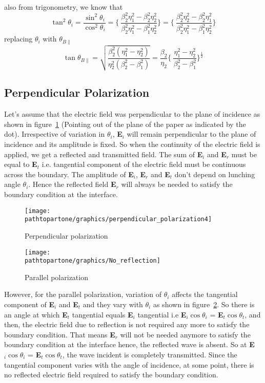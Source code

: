 also from trigonometry, we know that
\begin{equation*}
\tan^2\theta_i = \dfrac{\sin^2\theta_i}{\cos^2\theta_i} = \Bigg\{\ \dfrac{\beta^2_2\eta^2_1 - \beta^2_2\eta^2_2}{\beta^2_2\eta^2_1 - \beta^2_1\eta^2_2} \Bigg\} = \Bigg\{\ \dfrac{\beta^2_2\eta^2_2 - \beta^2_2\eta^2_1}{\beta^2_2\eta^2_1 - \beta^2_1\eta^2_2} \Bigg\}
\end{equation*}
replacing $\theta_i$ with $\theta_{B\parallel}$
\begin{equation}
\tan\theta_{B\parallel} = \sqrt{\dfrac{\beta^2_2(\eta^2_1 - \eta^2_2)}{\eta^2_2(\beta^2_2 - \beta^2_1)}} = \dfrac{\beta_2}{\eta_2}\Bigg\{\ \dfrac{\eta^2_1 - \eta^2_2}{\beta^2_2 - \beta^2_1} \Bigg\}^{\frac{1}{2}}
\end{equation}

\subsection{Perpendicular Polarization}
Let's assume that the electric field was perpendicular to the plane of incidence as shown in figure~\ref{fig:mcben1} (Pointing out of the plane of the paper as indicated by the dot). Irrespective of variation in $\theta_i$,  \textbf{E}$_i$ will remain perpendicular to the plane of incidence and its amplitude is fixed. So when the continuity of the electric field is applied, we get a reflected and transmitted field. The sum of \textbf{E}$_i$ and \textbf{E}$_r$ must be equal to \textbf{E}$_t$ i.e. tangential component of the electric field must be continuous across the boundary. The amplitude of \textbf{E}$_i$, \textbf{E}$_r$ and \textbf{E}$_t$ don't depend on lunching angle $\theta_i$. Hence the reflected field \textbf{E}$_r$ will always be needed to satisfy the boundary condition at the interface.
\begin{figure}[h]
\centering
\texttt{[image: \\pathtopartone/graphics/perpendicular\_polarization4]}
\caption{Perpendicular polarization}
\label{fig:mcben1}
\end{figure}
\begin{figure}[h]
\centering
\texttt{[image: \\pathtopartone/graphics/No\_reflection]}
\caption{Parallel polarization}
\label{fig:mcben2}
\end{figure}	

However, for the parallel polarization, variation of $\theta_i$ affects the tangential component of \textbf{E}$_i$ and \textbf{E}$_t$ and they vary with $\theta_i$ as shown in figure~\ref{fig:mcben2}. So there is an angle at which \textbf{E}$_t$ tangential equals \textbf{E}$_i$ tangential i.e \textbf{E}$_i\cos\theta_i$ = \textbf{E}$_t\cos\theta_t$, and then, the electric field due to reflection is not required any more to satisfy the boundary condition. That means \textbf{E}$_r$ will not be needed anymore to satisfy the boundary condition at the interface hence, the reflected wave is absent. So at \textbf{E}$_i\cos\theta_i$ = \textbf{E}$_t\cos\theta_t$, the wave incident is completely transmitted. Since the tangential component varies with the angle of incidence, at some point, there is no reflected electric field required to satisfy the boundary condition.

